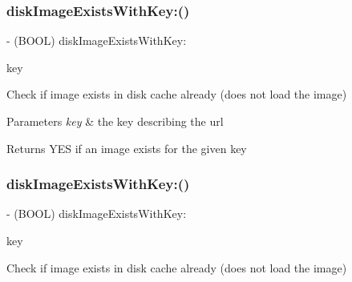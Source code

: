 \subsubsection{\texorpdfstring{disk\+Image\+Exists\+With\+Key\+:()}{diskImageExistsWithKey:()}\hspace{0.1cm}{\footnotesize\ttfamily [1/3]}}
{\footnotesize\ttfamily -\/ (B\+O\+OL) disk\+Image\+Exists\+With\+Key\+: \begin{DoxyParamCaption}\item[{(N\+S\+String $\ast$)}]{key }\end{DoxyParamCaption}}

Check if image exists in disk cache already (does not load the image)


\begin{DoxyParams}{Parameters}
{\em key} & the key describing the url\\
\hline
\end{DoxyParams}
\begin{DoxyReturn}{Returns}
Y\+ES if an image exists for the given key 
\end{DoxyReturn}
\mbox{\label{interface_s_d_image_cache_a67feea7b5568f427dfcf4f380abc1ba7}} 
\subsubsection{\texorpdfstring{disk\+Image\+Exists\+With\+Key\+:()}{diskImageExistsWithKey:()}\hspace{0.1cm}{\footnotesize\ttfamily [2/3]}}
{\footnotesize\ttfamily -\/ (B\+O\+OL) disk\+Image\+Exists\+With\+Key\+: \begin{DoxyParamCaption}\item[{(N\+S\+String $\ast$)}]{key }\end{DoxyParamCaption}}

Check if image exists in disk cache already (does not load the image)


